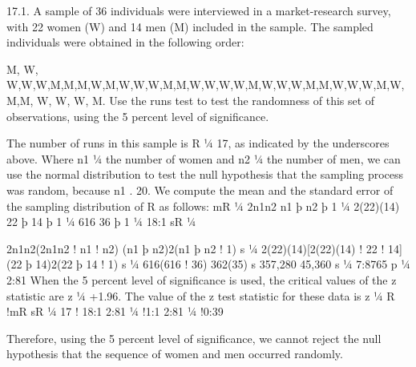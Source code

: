 17.1. A sample of 36 individuals were interviewed in a market-research survey, with 22 women (W) and 14
men (M) included in the sample. The sampled individuals were obtained in the following order: 

M, W,
W,W,W,M,M,M,W,M,W,W,W,M,M,W,W,W,W,M,W,W,W,M,M,W,W,W,M,W,M,M,
W, W, W, M. 
Use the runs test to test the randomness of this set of observations, using the 5 percent
level of significance.

The number of runs in this sample is R ¼ 17, as indicated by the underscores above. Where n1 ¼ the number of
women and n2 ¼ the number of men, we can use the normal distribution to test the null hypothesis that the sampling
process was random, because n1 . 20. We compute the mean and the standard error of the sampling distribution of
R as follows:
mR ¼
2n1n2
n1 þ n2 þ 1 ¼
2(22)(14)
22 þ 14 þ 1 ¼
616
36 þ 1 ¼ 18:1
sR ¼

2n1n2(2n1n2 ! n1 ! n2)
(n1 þ n2)2(n1 þ n2 ! 1)
s
¼
2(22)(14)[2(22)(14) ! 22 ! 14]
(22 þ 14)2(22 þ 14 ! 1)
s
¼
616(616 ! 36)
362(35)
s
357,280
45,360
s
¼
7:8765 p
¼ 2:81
When the 5 percent level of significance is used, the critical values of the z statistic are z ¼ +1.96. The value
of the z test statistic for these data is
z ¼
R !mR
sR ¼
17 ! 18:1
2:81 ¼ !1:1
2:81 ¼ !0:39

Therefore, using the 5 percent level of significance, we cannot reject the null hypothesis that the sequence of
women and men occurred randomly.
